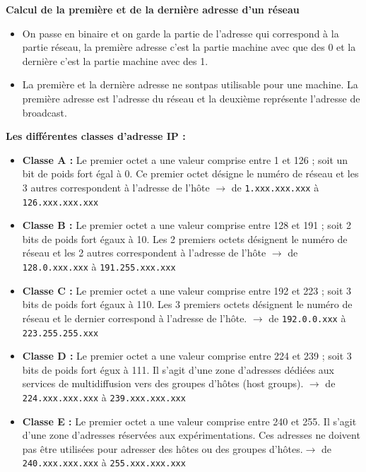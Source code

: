 \documentclass[a4paper,9pt, twocolumn]{article}
\begin{document}
\textbf{Calcul de la première et de la dernière adresse d'un réseau}
\begin{itemize}
\item On passe en binaire et on garde la partie de l'adresse qui correspond à la partie réseau, la première adresse c'est la partie machine avec que des 0 et la dernière c'est la partie machine avec des 1.
\item La première et la dernière adresse ne sontpas utilisable pour une machine. La première adresse est l'adresse du réseau et la deuxième représente l'adresse de broadcast.
\end{itemize}
\textbf{Les différentes classes d'adresse IP :}
\begin{itemize}
\item \textbf{Classe A :} Le premier octet a une valeur comprise entre 1 et 126 ; soit un bit de poids fort égal à 0. Ce premier octet désigne le numéro de réseau et les 3 autres correspondent à l'adresse de l'hôte $\longrightarrow$ de \texttt{1.xxx.xxx.xxx} à \texttt{126.xxx.xxx.xxx}
\item \textbf{Classe B :} Le premier octet a une valeur comprise entre 128 et 191 ; soit 2 bits de poids fort égaux à 10. Les 2 premiers octets désignent le numéro de réseau et les 2 autres correspondent à l'adresse de l'hôte $\longrightarrow$ de \texttt{128.0.xxx.xxx} à \texttt{191.255.xxx.xxx}
\item \textbf{Classe C :} Le premier octet a une valeur comprise entre 192 et 223 ; soit 3 bits de poids fort égaux à 110. Les 3 premiers octets désignent le numéro de réseau et le dernier correspond à l'adresse de l'hôte. $\longrightarrow$ de \texttt{192.0.0.xxx} à \texttt{223.255.255.xxx}
\item \textbf{Classe D :} Le premier octet a une valeur comprise entre 224 et 239 ; soit 3 bits de poids fort égux à 111. Il s'agit d'une zone d'adresses dédiées aux services de multidiffusion vers des groupes d'hôtes (host groups). $\longrightarrow$ de \texttt{224.xxx.xxx.xxx} à \texttt{239.xxx.xxx.xxx}
\item \textbf{Classe E : }Le premier octet a une valeur comprise entre 240 et 255. Il s'agit d'une zone d'adresses réservées aux expérimentations. Ces adresses ne doivent pas être utilisées pour adresser des hôtes ou des groupes d'hôtes.$\longrightarrow$ de \texttt{240.xxx.xxx.xxx} à \texttt{255.xxx.xxx.xxx}
\end{itemize}
\end{document}
